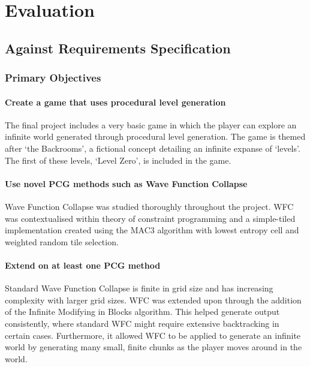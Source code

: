 \chapter{Evaluation}

\section{Against Requirements Specification}
\subsection{Primary Objectives}
\subsubsection{Create a game that uses procedural level generation}
The final project includes a very basic game in which the player can explore an infinite world generated through procedural level generation. The game is themed after `the Backrooms', a fictional concept detailing an infinite expanse of `levels'. The first of these levels, `Level Zero', is included in the game.

\subsubsection{Use novel PCG methods such as Wave Function Collapse}
Wave Function Collapse was studied thoroughly throughout the project. WFC was contextualised within theory of constraint programming and a simple-tiled implementation created using the MAC3 algorithm with lowest entropy cell and weighted random tile selection.

\subsubsection{Extend on at least one PCG method}
Standard Wave Function Collapse is finite in grid size and has increasing complexity with larger grid sizes. WFC was extended upon through the addition of the Infinite Modifying in Blocks algorithm. This helped generate output consistently, where standard WFC might require extensive backtracking in certain cases. Furthermore, it allowed WFC to be applied to generate an infinite world by generating many small, finite chunks as the player moves around in the world.

